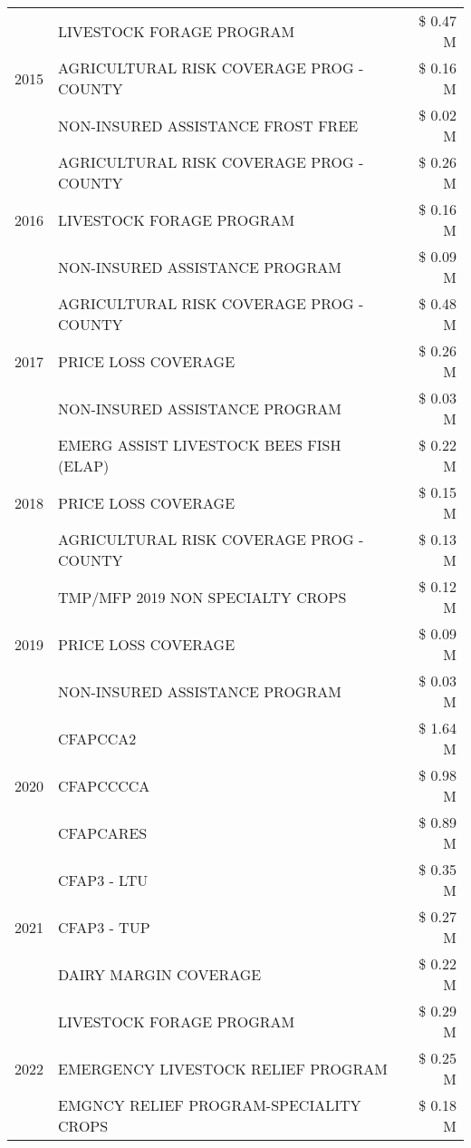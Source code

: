 \begin{tabular}{llr}
\multirow[t]{3}{*}{2015} & LIVESTOCK FORAGE PROGRAM & \$ 0.47 M \\
 & AGRICULTURAL RISK COVERAGE PROG - COUNTY & \$ 0.16 M \\
 & NON-INSURED ASSISTANCE FROST FREE & \$ 0.02 M \\
\cline{1-3}
\multirow[t]{3}{*}{2016} & AGRICULTURAL RISK COVERAGE PROG - COUNTY & \$ 0.26 M \\
 & LIVESTOCK FORAGE PROGRAM & \$ 0.16 M \\
 & NON-INSURED ASSISTANCE PROGRAM & \$ 0.09 M \\
\cline{1-3}
\multirow[t]{3}{*}{2017} & AGRICULTURAL RISK COVERAGE PROG - COUNTY & \$ 0.48 M \\
 & PRICE LOSS COVERAGE & \$ 0.26 M \\
 & NON-INSURED ASSISTANCE PROGRAM & \$ 0.03 M \\
\cline{1-3}
\multirow[t]{3}{*}{2018} & EMERG ASSIST LIVESTOCK BEES FISH (ELAP) & \$ 0.22 M \\
 & PRICE LOSS COVERAGE & \$ 0.15 M \\
 & AGRICULTURAL RISK COVERAGE PROG - COUNTY & \$ 0.13 M \\
\cline{1-3}
\multirow[t]{3}{*}{2019} & TMP/MFP 2019 NON SPECIALTY CROPS & \$ 0.12 M \\
 & PRICE LOSS COVERAGE & \$ 0.09 M \\
 & NON-INSURED ASSISTANCE PROGRAM & \$ 0.03 M \\
\cline{1-3}
\multirow[t]{3}{*}{2020} & CFAPCCA2 & \$ 1.64 M \\
 & CFAPCCCCA & \$ 0.98 M \\
 & CFAPCARES & \$ 0.89 M \\
\cline{1-3}
\multirow[t]{3}{*}{2021} & CFAP3 - LTU & \$ 0.35 M \\
 & CFAP3 - TUP & \$ 0.27 M \\
 & DAIRY MARGIN COVERAGE & \$ 0.22 M \\
\cline{1-3}
\multirow[t]{3}{*}{2022} & LIVESTOCK FORAGE PROGRAM & \$ 0.29 M \\
 & EMERGENCY LIVESTOCK RELIEF PROGRAM & \$ 0.25 M \\
 & EMGNCY RELIEF PROGRAM-SPECIALITY CROPS & \$ 0.18 M \\
\cline{1-3}
\bottomrule
\end{tabular}
